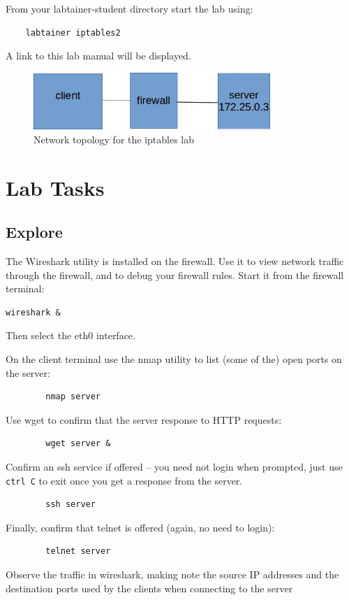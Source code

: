 From your labtainer-student directory start the lab using:
\begin{verbatim}
    labtainer iptables2
\end{verbatim}
\noindent A link to this lab manual will be displayed.  


\begin{figure}[htb]
\begin{center}
\includegraphics [width=0.8\textwidth,natwidth=621,natheight=403]{iptables.jpg}
\end{center}
\caption{Network topology for the iptables lab}
\label{fig:topology}
\end{figure}

\section{Lab Tasks}
\subsection{Explore}
The Wireshark utility is installed on the firewall. 
Use it to view network traffic through the firewall, and to 
debug your firewall rules.  Start it from the firewall terminal:
\begin{verbatim}
wireshark &
\end{verbatim}
\noindent Then select the eth0 interface.

On the client terminal use the nmap utility 
to list (some of the) open ports on the server:

\begin{verbatim}
        nmap server
\end{verbatim}
\noindent 

\noindent Use wget to confirm that the server response to HTTP requests:
\begin{verbatim}
        wget server &
\end{verbatim}
\noindent Confirm an ssh service if offered -- you need not login when prompted,
just use {\tt ctrl C} to exit once you get a response from the server.
\begin{verbatim}
        ssh server
\end{verbatim}
\noindent Finally, confirm that telnet is offered (again, no need to login):
\begin{verbatim}
        telnet server
\end{verbatim}
\noindent Observe the traffic in wireshark, making note the
source IP addresses and the destination ports used by the 
clients when connecting to the server

